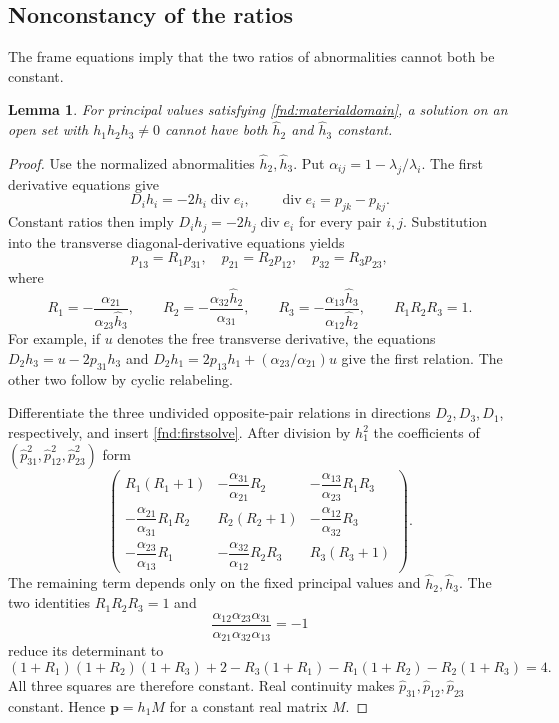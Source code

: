 \documentclass[11pt,a4paper]{article}
\numberwithin{equation}{section}
\theoremstyle{plain}
\newtheorem{lemma}[theorem]{Lemma}
\theoremstyle{definition}
\theoremstyle{remark}
\begin{document}
\subsection{Nonconstancy of the ratios}\label{fnd:ratiosubsection}
The frame equations imply that the two ratios of abnormalities cannot
both be constant.

\begin{lemma}\label{fnd:constantratio}
For principal values satisfying \eqref{fnd:materialdomain}, a solution on an open set with \mbox{$h_1h_2h_3\ne0$} cannot have both $\widehat h_2$ and $\widehat h_3$ constant.
\end{lemma}
\begin{proof}
Use the normalized abnormalities $\widehat h_2,\widehat h_3$. Put $\alpha_{ij}=1-\lambda_j/\lambda_i$. The first derivative equations give
\[
D_ih_i=-2h_i\operatorname{div}e_i,
\qquad \operatorname{div}e_i=p_{jk}-p_{kj}.
\]
Constant ratios then imply $D_ih_j=-2h_j\operatorname{div}e_i$ for every pair $i,j$. Substitution into the transverse diagonal-derivative equations yields
\[
p_{13}=R_1p_{31},\quad p_{21}=R_2p_{12},\quad p_{32}=R_3p_{23},
\]
where
\[
R_1=-\frac{\alpha_{21}}{\alpha_{23}\widehat h_3},\qquad
R_2=-\frac{\alpha_{32}\widehat h_2}{\alpha_{31}},\qquad
R_3=-\frac{\alpha_{13}\widehat h_3}{\alpha_{12}\widehat h_2},\qquad R_1R_2R_3=1.
\]
For example, if $u$ denotes the free transverse derivative, the equations $D_2h_3=u-2p_{31}h_3$ and $D_2h_1=2p_{13}h_1+(\alpha_{23}/\alpha_{21})u$ give the first relation. The other two follow by cyclic relabeling.

Differentiate the three undivided opposite-pair relations in directions $D_2,D_3,D_1$, respectively, and insert \eqref{fnd:firstsolve}. After division by $h_1^2$ the coefficients of $(\widehat p_{31}^2,\widehat p_{12}^2,\widehat p_{23}^2)$ form
\[
\begin{pmatrix}
R_1(R_1+1)&-\dfrac{\alpha_{31}}{\alpha_{21}}R_2&-\dfrac{\alpha_{13}}{\alpha_{23}}R_1R_3\\
-\dfrac{\alpha_{21}}{\alpha_{31}}R_1R_2&R_2(R_2+1)&-\dfrac{\alpha_{12}}{\alpha_{32}}R_3\\
-\dfrac{\alpha_{23}}{\alpha_{13}}R_1&-\dfrac{\alpha_{32}}{\alpha_{12}}R_2R_3&R_3(R_3+1)
\end{pmatrix}.
\]
The remaining term depends only on the fixed principal values and $\widehat h_2,\widehat h_3$. The two identities $R_1R_2R_3=1$ and
\[
\frac{\alpha_{12}\alpha_{23}\alpha_{31}}
{\alpha_{21}\alpha_{32}\alpha_{13}}=-1
\]
reduce its determinant to
\[
(1+R_1)(1+R_2)(1+R_3)+2
-R_3(1+R_1)-R_1(1+R_2)-R_2(1+R_3)=4.
\]
All three squares are therefore constant. Real continuity makes $\widehat p_{31},\widehat p_{12},\widehat p_{23}$ constant. Hence $\boldsymbol p=h_1M$ for a constant real matrix $M$.


\end{proof}
\end{document}
